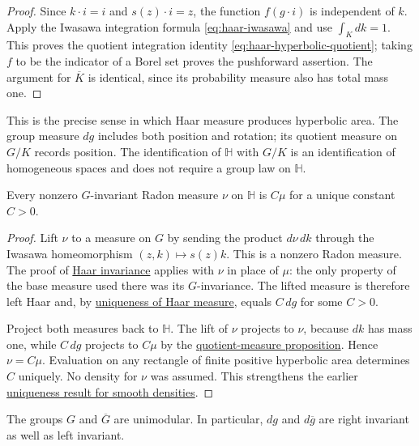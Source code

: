 \begin{proof}
Since $k\cdot i=i$ and $s(z)\cdot i=z$, the function $f(g\cdot i)$ is independent of $k$. Apply the Iwasawa integration formula \eqref{eq:haar-iwasawa} and use $\int_K dk=1$. This proves the quotient integration identity \eqref{eq:haar-hyperbolic-quotient}; taking $f$ to be the indicator of a Borel set proves the pushforward assertion. The argument for $\overline K$ is identical, since its probability measure also has total mass one.
\end{proof}

This is the precise sense in which Haar measure produces hyperbolic area. The group measure $dg$ includes both position and rotation; its quotient measure on $G/K$ records position. The identification of $\mathbb H$ with $G/K$ is an identification of homogeneous spaces and does not require a group law on $\mathbb H$.

\begin{corollary}\label{hyperbolic.invariant-radon-measure}
Every nonzero $G$-invariant Radon measure $\nu$ on $\mathbb H$ is $C\mu$ for a unique constant $C>0$.
\end{corollary}

\begin{proof}
Lift $\nu$ to a measure on $G$ by sending the product $d\nu\,dk$ through the Iwasawa homeomorphism $(z,k)\mapsto s(z)k$. This is a nonzero Radon measure. The proof of \hyperref[modular.haar-invariance]{Haar invariance} applies with $\nu$ in place of $\mu$: the only property of the base measure used there was its $G$-invariance. The lifted measure is therefore left Haar and, by \hyperref[measure.haar-uniqueness-summary]{uniqueness of Haar measure}, equals $C\,dg$ for some $C>0$.

Project both measures back to $\mathbb H$. The lift of $\nu$ projects to $\nu$, because $dk$ has mass one, while $C\,dg$ projects to $C\mu$ by the \hyperref[hyperbolic.haar-quotient]{quotient-measure proposition}. Hence $\nu=C\mu$. Evaluation on any rectangle of finite positive hyperbolic area determines $C$ uniquely. No density for $\nu$ was assumed. This strengthens the earlier \hyperref[hyperbolic.invariant-density]{uniqueness result for smooth densities}.
\end{proof}

\begin{proposition}\label{modular.unimodular}
The groups $G$ and $\overline G$ are unimodular. In particular, $dg$ and $d\overline g$ are right invariant as well as left invariant.
\end{proposition}

